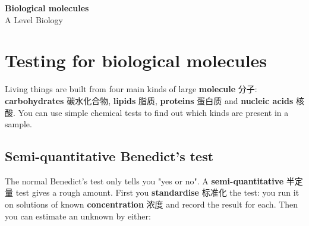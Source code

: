 \documentclass[11pt]{article}
\begin{document}
\begin{center}
  {\LARGE\bfseries Biological molecules}\\[0.35em]
  {\large A Level Biology}
\end{center}
\vspace{0.6em}

\section*{Testing for biological molecules}

Living things are built from four main kinds of large \textbf{molecule} 分子: \textbf{carbohydrates} 碳水化合物, \textbf{lipids} 脂质, \textbf{proteins} 蛋白质 and \textbf{nucleic acids} 核酸. You can use simple chemical tests to find out which kinds are present in a sample.

\begin{center}
\end{center}

\subsection*{Semi-quantitative Benedict's test}

The normal Benedict's test only tells you "yes or no". A \textbf{semi-quantitative} 半定量 test gives a rough amount. First you \textbf{standardise} 标准化 the test: you run it on solutions of known \textbf{concentration} 浓度 and record the result for each. Then you can estimate an unknown by either:
\end{document}
